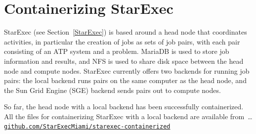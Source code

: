 \documentclass{easychair}
\newcommand{\dav}[1]{{\color{red}{David: {#1}}}}
\begin{document}
\section{Containerizing StarExec}
\label{ContainerizingStarExec}



StarExec (see Section~\ref{StarExec}) is based around a head node that coordinates activities, 
in particular the creation of jobs as sets of job pairs, with each pair consisting of an ATP 
system and a problem. 
MariaDB is used to store job information and results, and NFS is used to share disk space between 
the head node and compute nodes. 
StarExec currently offers two backends for running job pairs: the local backend runs pairs on 
the same computer as the head node, and the Sun Grid Engine (SGE) backend sends pairs out to 
compute nodes.

So far, the head node with a local backend has been successfully containerized.
All the files for containerizing StarExec with a local backend are available from~\ldots \\
\hspace*{1cm}\href{https://github.com/StarExecMiami/starexec-containerized}{\tt github.com/StarExecMiami/starexec-containerized}\\
\end{document}

